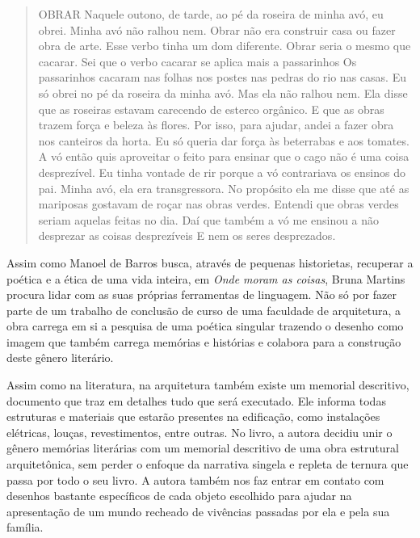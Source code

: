 \documentclass[11pt]{extarticle}
\begin{document}
\begin{quote}

OBRAR
Naquele outono, de tarde, ao pé da roseira de minha avó, eu obrei. Minha avó não ralhou nem. Obrar não era construir casa ou fazer obra de arte. Esse verbo tinha um dom diferente. Obrar seria o mesmo que cacarar. Sei que o verbo cacarar se aplica mais a passarinhos Os passarinhos cacaram nas folhas nos postes nas pedras do rio nas casas. Eu só obrei no pé da roseira da minha avó. Mas ela não ralhou nem. Ela disse que as roseiras estavam carecendo de esterco orgânico. E que as obras trazem força e beleza às flores. Por isso, para ajudar, andei a fazer obra nos canteiros da horta. Eu só queria dar força às beterrabas e aos tomates. A vó então quis aproveitar o feito para ensinar que o cago não é uma coisa desprezível. Eu tinha vontade de rir porque a vó contrariava os ensinos do pai. Minha avó, ela era transgressora. No propósito ela me disse que até as mariposas gostavam de roçar nas obras verdes. Entendi que obras verdes seriam aquelas feitas no dia. Daí que também a vó me ensinou a não desprezar as coisas desprezíveis E nem os seres desprezados. 


\end{quote}

Assim como Manoel de Barros busca, através de pequenas historietas, recuperar a poética e a ética de uma vida inteira, em \textit{Onde moram as coisas}, Bruna Martins procura lidar com as suas próprias ferramentas de linguagem. Não só por fazer parte de um trabalho de conclusão de curso de uma faculdade de arquitetura, a obra carrega em si a pesquisa de uma poética singular trazendo o desenho como imagem que também carrega memórias e histórias e colabora para a construção deste gênero literário. 

Assim como na literatura, na arquitetura também existe um memorial descritivo, documento que traz em detalhes tudo que será executado. Ele informa todas estruturas e materiais que estarão presentes na edificação, como instalações elétricas, louças, revestimentos, entre outras. No livro, a autora decidiu unir o gênero memórias literárias com um memorial descritivo de uma obra estrutural arquitetônica, sem perder o enfoque da narrativa singela e repleta de ternura que passa por todo o seu livro. A autora também nos faz entrar em contato com desenhos bastante específicos de cada objeto escolhido para ajudar na apresentação de um mundo recheado de vivências passadas por ela e pela sua família.
\end{document}
